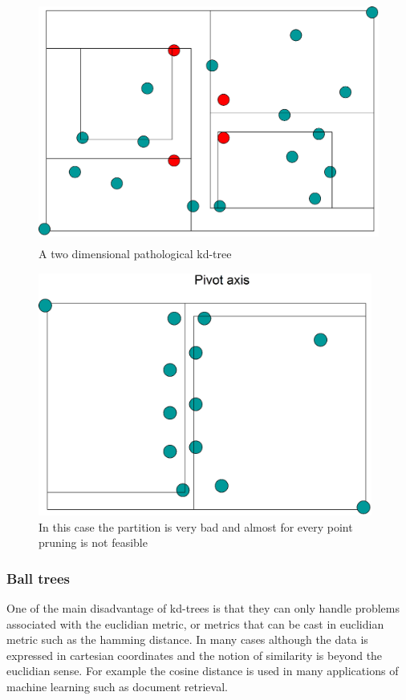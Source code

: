 \documentclass[12pt,letterpaper,doublespaced,ETD,dvips,proposal]{gtthesis}
\begin{document}
\begin{Body}
\begin{figure}[!htb]
\label{kd_pathological_points}
\centerline{\includegraphics[height=8cm]{kd_pathological_points.eps}}
\caption{A two dimensional pathological kd-tree}
\end{figure}


\begin{figure}[!htb]
\label{pathological_kd_tree}
\centerline{\includegraphics[height=8cm]{pathological_kd_tree.eps}}
\caption{In this case the partition is very bad and almost for every point pruning is not
feasible}
\end{figure}




\subsubsection{Ball trees}
One of the main disadvantage of kd-trees is that they can only
handle problems associated with the euclidian metric, or metrics
that can be cast in euclidian metric such as the hamming distance.
In many cases although the data is expressed in cartesian
coordinates and the notion of similarity is beyond the euclidian sense.
For example the cosine distance is used in many applications of
machine learning such as document retrieval.


\end{Body}
\end{document}
